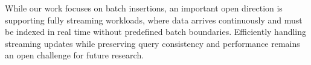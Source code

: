 \documentclass[a4paper,11pt,twoside,openany]{book}
\begin{document}
While our work focuses on batch insertions, an important open direction is supporting
fully streaming workloads, where data arrives continuously and must be indexed in real
time without predefined batch boundaries. Efficiently handling streaming updates while
preserving query consistency and performance remains an open challenge for future research.




{}

\end{document}
